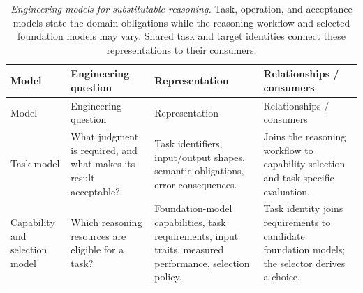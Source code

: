 {\footnotesize
\begin{longtable}[]{@{}
  >{\raggedright\arraybackslash}p{}
  >{\raggedright\arraybackslash}p{}
  >{\raggedright\arraybackslash}p{}
  >{\raggedright\arraybackslash}p{}@{}}
\caption[Engineering models for substitutable reasoning]{\emph{Engineering models for substitutable reasoning.} Task, operation, and acceptance models state the domain obligations while the reasoning workflow and selected foundation models may vary. Shared task and target identities connect these representations to their consumers.}\label{handbook-substitution-models}\tabularnewline
\toprule\noalign{}
\begin{minipage}[b]{\linewidth}\raggedright
Model
\end{minipage} & \begin{minipage}[b]{\linewidth}\raggedright
Engineering question
\end{minipage} & \begin{minipage}[b]{\linewidth}\raggedright
Representation
\end{minipage} & \begin{minipage}[b]{\linewidth}\raggedright
Relationships / consumers
\end{minipage} \\
\midrule\noalign{}
\endfirsthead
\toprule\noalign{}
\begin{minipage}[b]{\linewidth}\raggedright
Model
\end{minipage} & \begin{minipage}[b]{\linewidth}\raggedright
Engineering question
\end{minipage} & \begin{minipage}[b]{\linewidth}\raggedright
Representation
\end{minipage} & \begin{minipage}[b]{\linewidth}\raggedright
Relationships / consumers
\end{minipage} \\
\midrule\noalign{}
\endhead
\bottomrule\noalign{}
\endlastfoot
Task model & What judgment is required, and what makes its result acceptable? & Task identifiers, input/output shapes, semantic obligations, error consequences. & Joins the reasoning workflow to capability selection and task-specific evaluation. \\
Capability and selection model & Which reasoning resources are eligible for a task? & Foundation-model capabilities, task requirements, input traits, measured performance, selection policy. & Task identity joins requirements to candidate foundation models; the selector derives a choice. \\

\end{longtable}}
